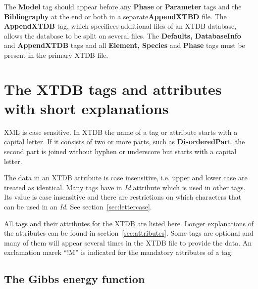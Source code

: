 \documentclass{article}
\begin{document}
The {\bf Model} tag should appear before any {\bf Phase} or {\bf
  Parameter} tags and the {\bf Bibliography} at the end or both in a
separate{\bf AppendXTBD} file.  The {\bf AppendXTDB} tag, which
specifices additional files of an XTDB database, allows the database to
be split on several files.  The {\bf Defaults, DatabaseInfo} and {\bf
  AppendXTDB} tags and all {\bf Element, Species} and {\bf Phase} tags
must be present in the primary XTDB file.

\section{The XTDB tags and attributes with short explanations}\label{sec:tags}

XML is case sensitive.  In XTDB the name of a tag or attribute starts
with a capital letter.  If it consists of two or more parts, such as
{\bf DisorderedPart}, the second part is joined without hyphen or
underscore but starts with a capital letter.

The data in an XTDB attribute is case insensitive, i.e. upper and
lower case are treated as identical.  Many tags have in {\em Id}
attribute which is used in other tags.  Its value is case insensitive
and there are restrictions on which characters that can be used in an
{\em Id}.  See section~\ref{sec:lettercase}.

All tags and their attributes for the XTDB are listed here. Longer
explanations of the attributes can be found in
section~\ref{sec:attributes}.  Some tags are optional and many of them
will appear several times in the XTDB file to provide the data.  An
exclamation marek ``!M'' is indicated for the mandatory attributes of
a tag.

\subsection{The Gibbs energy function}\label{sec:gfun}
\end{document}
